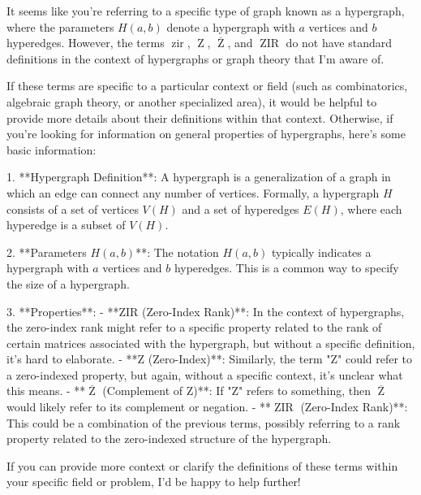 It seems like you're referring to a specific type of graph known as a hypergraph, where the parameters \( H(a,b) \) denote a hypergraph with \( a \) vertices and \( b \) hyperedges. However, the terms \(\operatorname{zir}\), \(\operatorname{Z}\), \(\overline{\operatorname{Z}}\), and \(\operatorname{ZIR}\) do not have standard definitions in the context of hypergraphs or graph theory that I'm aware of.

If these terms are specific to a particular context or field (such as combinatorics, algebraic graph theory, or another specialized area), it would be helpful to provide more details about their definitions within that context. Otherwise, if you're looking for information on general properties of hypergraphs, here's some basic information:

1. **Hypergraph Definition**: A hypergraph is a generalization of a graph in which an edge can connect any number of vertices. Formally, a hypergraph \( H \) consists of a set of vertices \( V(H) \) and a set of hyperedges \( E(H) \), where each hyperedge is a subset of \( V(H) \).

2. **Parameters \( H(a,b) \)**: The notation \( H(a,b) \) typically indicates a hypergraph with \( a \) vertices and \( b \) hyperedges. This is a common way to specify the size of a hypergraph.

3. **Properties**:
   - **ZIR (Zero-Index Rank)**: In the context of hypergraphs, the zero-index rank might refer to a specific property related to the rank of certain matrices associated with the hypergraph, but without a specific definition, it's hard to elaborate.
   - **Z (Zero-Index)**: Similarly, the term "Z" could refer to a zero-indexed property, but again, without a specific context, it's unclear what this means.
   - **\(\overline{\operatorname{Z}}\) (Complement of Z)**: If "Z" refers to something, then \(\overline{\operatorname{Z}}\) would likely refer to its complement or negation.
   - **\(\operatorname{ZIR}\) (Zero-Index Rank)**: This could be a combination of the previous terms, possibly referring to a rank property related to the zero-indexed structure of the hypergraph.

If you can provide more context or clarify the definitions of these terms within your specific field or problem, I'd be happy to help further!